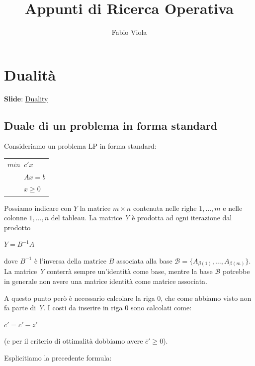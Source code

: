 \documentclass[11pt]{book}
\title{Appunti di Ricerca Operativa}
\author{Fabio Viola}
\date{}
\begin{document}
\chapter{Dualit\`a}

\scriptsize
{\bf Slide}:
\href{http://www.or.deis.unibo.it/staff_pages/martello/Chapter5.zip}{Duality}
\normalsize
\vspace{20pt}

\section{Duale di un problema in forma standard}

Consideriamo un problema LP in forma standard:

\vspace{11pt}
\begin{center}
\begin{tabular}{l}
$min\phantom{a}c'x$ \\
$\phantom{mina}Ax= b$ \\
$\phantom{mina}x\geq 0$ \\
\end{tabular}
\end{center}
\vspace{11pt}

Possiamo indicare con $Y$ la matrice $m \times n$ contenuta nelle
righe $1, \dots, m$ e nelle colonne $1, \dots, n$ del tableau. La
matrice {\em Y} \`e prodotta ad ogni iterazione dal prodotto

\begin{center}
$Y = B^{-1}A$  
\end{center}

dove $B^{-1}$ \`e l'inversa della matrice $B$ associata alla base
$\mathcal{B} = \{A_{\beta(1)},\dots,A_{\beta(m)} \}$. La matrice {\em
  Y} conterr\`a sempre un'identit\`a come base, mentre la base
$\mathcal{B}$ potrebbe in generale non avere una matrice identit\`a
come matrice associata.

A questo punto per\`o \`e necessario calcolare la riga 0, che come
abbiamo visto non fa parte di {\em Y}. I costi da inserire in riga 0
sono calcolati come:

\begin{center}
$\bar{c}' = c' - z'$ 
\end{center}

(e per il criterio di ottimalit\`a dobbiamo avere $\bar{c}'\geq 0$).

Esplicitiamo la precedente formula:
\end{document}
